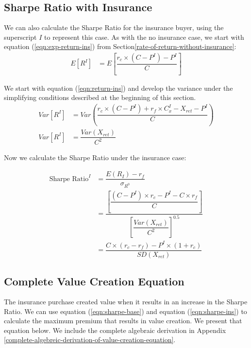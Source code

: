 \documentclass[
]{article}
\begin{document}
\hypertarget{sharpe-ratio-with-insurance}{%
\subsection{Sharpe Ratio with
Insurance}\label{sharpe-ratio-with-insurance}}

We can also calculate the Sharpe Ratio for the insurance buyer, using
the superscript \(I\) to represent this case. As with the no insurance
case, we start with equation (\ref{eqn:exp-return-ins}) from
Section\ref{rate-of-return-without-insurance}: \[
\begin{aligned}
E[R^{I}] &= E[\dfrac{r_c \times (C - P^{I}) - P^{I}}{C}]
\end{aligned}
\]

We start with equation (\ref{eqn:return-ins}) and develop the variance
under the simplifying conditions described at the beginning of this
section. \[
\begin{aligned}
Var[R^{I}] &= Var(\dfrac{r_c \times (C - P^{I}) + r_f \times C_{x}^{I} - X_{ret} - P^{I}}{C})\\
Var[R^{I}] &=\dfrac{Var(X_{ret})}{C^2}
\end{aligned}
\]

Now we calculate the Sharpe Ratio under the insurance case:

\begin{align}
\nonumber \text{Sharpe Ratio}^I &= \dfrac{E(R_I)-r_f}{\sigma_{R^0}}\\
\nonumber &=\dfrac{\left[\dfrac{(C - P^{I}) \times r_c-P^{I} - C \times r_f}{C}\right]}{\left[\dfrac{Var(X_{ret})}{C^2}\right]^{0.5}}\\
&=\dfrac{C\times (r_c-r_f)-P^{I} \times(1 + r_c)}{SD(X_{ret})} \label{eqn:sharpe-ins}
\end{align}

\hypertarget{complete-value-creation-equation}{%
\subsection{Complete Value Creation
Equation}\label{complete-value-creation-equation}}

The insurance purchase created value when it results in an increase in
the Sharpe Ratio. We can use equation (\ref{eqn:sharpe-base}) and
equation (\ref{eqn:sharpe-ins}) to calculate the maximum premium that
results in value creation. We present that equation below. We include
the complete algebraic derivation in Appendix
\ref{complete-algebreic-derivation-of-value-creation-equation}.
\end{document}

